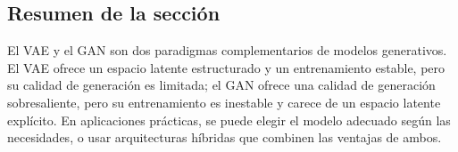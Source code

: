 \subsection{Resumen de la sección}

El VAE y el GAN son dos paradigmas complementarios de modelos generativos. El VAE ofrece un espacio latente estructurado y un entrenamiento estable, pero su calidad de generación es limitada; el GAN ofrece una calidad de generación sobresaliente, pero su entrenamiento es inestable y carece de un espacio latente explícito. En aplicaciones prácticas, se puede elegir el modelo adecuado según las necesidades, o usar arquitecturas híbridas que combinen las ventajas de ambos.

